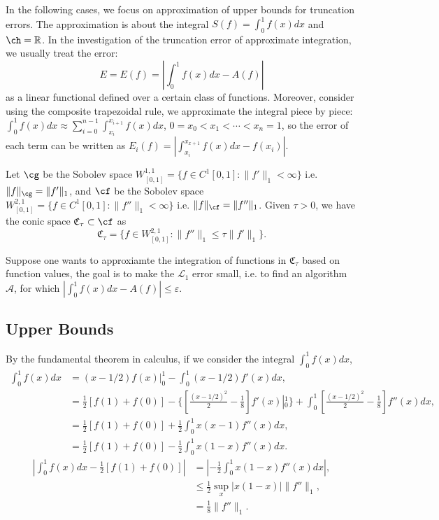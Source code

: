 
\newcommand{\R}{\mathbb{R}}
In the following cases, we focus on approximation of upper bounds for truncation errors. The approximation is about the integral $S(f)=\int_{0}^{1}f(x)dx$ and $\ch=\R$. In the investigation of the truncation error of approximate integration, we usually treat the error:
$$E=E(f)=\left|\int_{0}^{1}f(x)dx-A(f)\right|$$
as a linear functional defined over a certain class of functions. Moreover, consider using the composite trapezoidal rule, we approximate the integral piece by piece:
$\int_{0}^{1}f(x)dx\approx\sum_{i=0}^{n-1}\int_{x_{i}}^{x_{i+1}}f(x)dx$, $0=x_0<x_1<\cdots<x_n=1$, so the error of each term can be written as $E_i(f)=|\int_{x_{i}}^{x_{x+1}}f(x)dx-f(x_i)|$.

Let $\cg$ be the Sobolev space $W^{1,1}_{[0,1]}=\{f\in C^1[0,1]: \|f'\|_1<\infty\}$ i.e. $\|f\|_{\cg}=\|f'\|_{1}$, and $\cf$ be the Sobolev space $W^{2,1}_{[0,1]}=\{f\in C^1[0,1]: \|f''\|_1<\infty\}$ i.e. $\|f\|_{\cf}=\|f''\|_{1}$. Given $\tau > 0$, we have the conic space $\mathfrak{C}_{\tau} \subset \cf$ as $$\mathfrak{C}_{\tau}=\{f\in W^{2,1}_{[0,1]}:\|f''\|_1\leq\tau\|f'\|_1\}.$$

Suppose one wants to approxiamte the integration of functions in $\mathfrak{C}_{\tau}$ based on function values, the goal is to make the $\mathcal{L}_1$ error small, i.e. to find an algorithm $\mathcal{A}$, for which $|\int_{0}^{1}f(x)dx-A(f)|\leq \varepsilon$.
\subsection{Upper Bounds}
By the fundamental theorem in calculus, if we consider the integral $\int_{0}^{1}f(x)dx$,
\begin{align*}
  \int_{0}^{1}f(x)dx&=(x-1/2)f(x)\left|\right._{0}^{1}-\int_{0}^{1}(x-1/2)f'(x)dx,\\
  &=\frac{1}{2}[f(1)+f(0)]-\{[\frac{(x-1/2)^2}{2}-\frac{1}{8}]f'(x)\left|_{0}^{1}\right.\}+\int_{0}^{1}[\frac{(x-1/2)^2}{2}-\frac{1}{8}]f''(x)dx,\\
  &=\frac{1}{2}[f(1)+f(0)]+\frac{1}{2}\int_{0}^{1}x(x-1)f''(x)dx,\\
  &=\frac{1}{2}[f(1)+f(0)]-\frac{1}{2}\int_{0}^{1}x(1-x)f''(x)dx.
\end{align*}
\begin{align*}
  |\int_{0}^{1}f(x)dx-\frac{1}{2}[f(1)+f(0)]|&=|-\frac{1}{2}\int_{0}^{1}x(1-x)f''(x)dx|,\\
  &\leq\frac{1}{2}\sup_x|x(1-x)|\|f''\|_1,\\
  &=\frac{1}{8}\|f''\|_1.
\end{align*}

